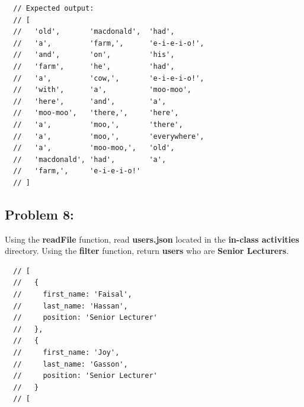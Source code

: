 \documentclass{article}
\begin{document}
\begin{verbatim}
  // Expected output:
  // [
  //   'old',       'macdonald',  'had',
  //   'a',         'farm,',      'e-i-e-i-o!',
  //   'and',       'on',         'his',
  //   'farm',      'he',         'had',
  //   'a',         'cow,',       'e-i-e-i-o!',
  //   'with',      'a',          'moo-moo',
  //   'here',      'and',        'a',
  //   'moo-moo',   'there,',     'here',
  //   'a',         'moo,',       'there',
  //   'a',         'moo,',       'everywhere',
  //   'a',         'moo-moo,',   'old',
  //   'macdonald', 'had',        'a',
  //   'farm,',     'e-i-e-i-o!'
  // ]
\end{verbatim}

\subsection*{Problem 8:} 
Using the \textbf{readFile} function, read \textbf{users.json} located in the \textbf{in-class activities} directory. Using the \textbf{filter} function, return \textbf{users} who are \textbf{Senior Lecturers}.

\begin{verbatim}
  // [
  //   {
  //     first_name: 'Faisal',
  //     last_name: 'Hassan',
  //     position: 'Senior Lecturer'
  //   },
  //   {
  //     first_name: 'Joy',
  //     last_name: 'Gasson',
  //     position: 'Senior Lecturer'
  //   }
  // [
\end{verbatim}
\end{document}
